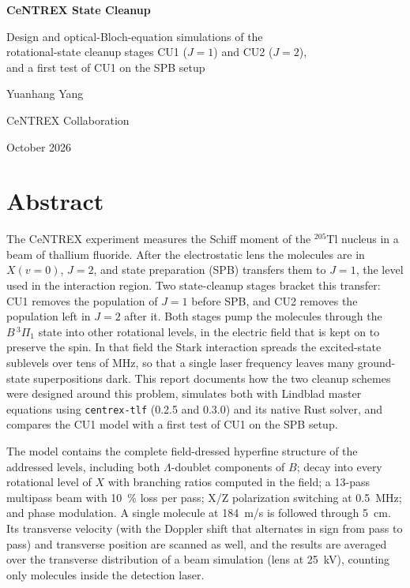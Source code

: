 \documentclass[11pt,a4paper,oneside]{report}
\newcommand{\code}[1]{\texttt{#1}}
\begin{document}
\begin{titlepage}
\centering
\vspace*{25mm}
{\Huge\bfseries CeNTREX State Cleanup\par}
\vspace{10mm}
{\Large Design and optical-Bloch-equation simulations of the\\[2mm]
rotational-state cleanup stages CU1 ($J=1$) and CU2 ($J=2$),\\[2mm]
and a first test of CU1 on the SPB setup\par}
\vspace{30mm}
{\large Yuanhang Yang\par}
\vspace{4mm}
{\large CeNTREX Collaboration\par}
\vfill
{\large October 2026\par}
\vspace{10mm}
\end{titlepage}

\chapter*{Abstract}

The CeNTREX experiment measures the Schiff moment of the $^{205}$Tl nucleus in a beam of
thallium fluoride. After the electrostatic lens the molecules are in $X(v{=}0)$, $J=2$, and
state preparation (SPB) transfers them to $J=1$, the level used in the interaction region.
Two state-cleanup stages bracket this transfer: CU1 removes the population of $J=1$ before
SPB, and CU2 removes the population left in $J=2$ after it. Both stages pump the molecules
through the $B\,{}^3\Pi_1$ state into other rotational levels, in the electric field that is
kept on to preserve the spin. In that field the Stark interaction spreads the excited-state
sublevels over tens of MHz, so that a single laser frequency leaves many ground-state
superpositions dark. This report documents how the two cleanup schemes were designed
around this problem, simulates both with Lindblad master equations using
\code{centrex-tlf} (0.2.5 and 0.3.0) and its native Rust solver, and compares the CU1 model with
a first test of CU1 on the SPB setup.

The model contains the complete field-dressed hyperfine structure of the addressed levels,
including both $\Lambda$-doublet components of $B$; decay into every rotational level of $X$
with branching ratios computed in the field; a 13-pass multipass beam with \SI{10}{\percent}
loss per pass; X/Z polarization switching at \SI{0.5}{MHz}; and phase modulation. A single
molecule at \SI{184}{m/s} is followed through \SI{5}{cm}. Its transverse velocity (with the
Doppler shift that alternates in sign from pass to pass) and transverse position are scanned
as well, and the results are averaged over the transverse distribution of a beam simulation
(lens at \SI{25}{kV}), counting only molecules inside the detection laser.
\end{document}

